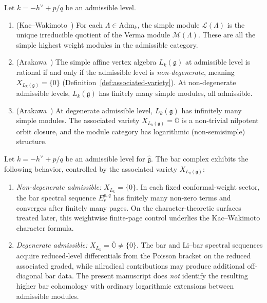 \begin{theorem}
\label{thm:admissible-rep-theory}
Let $k = -h^\vee + p/q$ be an admissible level.
\begin{enumerate}[label=\textup{(\roman*)}]
\item \textup{(}Kac--Wakimoto~\cite{KW88}\textup{)}
 For each $\Lambda \in \mathrm{Adm}_k$, the simple module
 $\mathcal{L}(\Lambda)$ is the unique irreducible quotient of
 the Verma module $\mathcal{M}(\Lambda)$. These are all the
 simple highest weight modules in the admissible category.
\item \textup{(}Arakawa~\cite{Arakawa17}\textup{)}
 The simple affine vertex algebra $L_k(\mathfrak{g})$ at
 admissible level is rational if and only if the admissible level
 is \emph{non-degenerate}, meaning $X_{L_k(\mathfrak{g})} = \{0\}$
 \textup{(}Definition~\textup{\ref{def:associated-variety})}.
 At non-degenerate admissible levels, $L_k(\mathfrak{g})$ has
 finitely many simple modules, all admissible.
\item \textup{(}Arakawa~\cite{Arakawa17}\textup{)}
 At degenerate admissible level, $L_k(\mathfrak{g})$ has
 infinitely many simple modules. The associated variety
 $X_{L_k(\mathfrak{g})} = \overline{\mathbb{O}}$ is a non-trivial
 nilpotent orbit closure, and the module category has
 logarithmic (non-semisimple) structure.
\end{enumerate}
\end{theorem}

\begin{proposition}
\label{prop:bar-admissible}
Let $k = -h^\vee + p/q$ be an admissible level for
$\widehat{\mathfrak{g}}$. The bar complex exhibits the
following behavior, controlled by the associated variety
$X_{L_k(\mathfrak{g})}$\textup{:}
\begin{enumerate}[label=\textup{(\roman*)}]
\item \emph{Non-degenerate admissible:}
 $X_{L_k} = \{0\}$. In each fixed conformal-weight sector,
 the bar spectral sequence $E_r^{p,q}$ has finitely many
 non-zero terms and converges after finitely many pages.
 On the character-theoretic surfaces treated later, this
 weightwise finite-page control underlies the
 Kac--Wakimoto character formula.
\item \emph{Degenerate admissible:}
 $X_{L_k} = \overline{\mathbb{O}} \neq \{0\}$. The bar
 and Li--bar spectral sequences acquire reduced-level
 differentials from the Poisson bracket on the reduced
 associated graded, while nilradical contributions may
 produce additional off-diagonal bar data. The present
 manuscript does \emph{not} identify the resulting higher
 bar cohomology with ordinary logarithmic extensions between
 admissible modules.
\end{enumerate}
\end{proposition}

